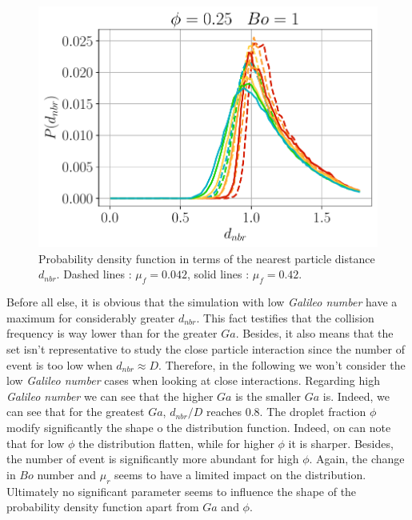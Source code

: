 \begin{figure}[h!]
    \includegraphics[height=0.15\textheight]{image/N_10/Pcond/probaNBo1PHI0_25.pdf}
    \caption{Probability density function in terms of the nearest particle distance $d_{nbr}$. Dashed lines : $\mu_f = 0.042$, solid lines : $\mu_f = 0.42$.} 
    \label{fig:Pdmin}
\end{figure} 
Before all else, it is obvious that the simulation with low \textit{Galileo number} have a maximum for considerably greater $d_{nbr}$. 
This fact testifies that the collision frequency is way lower than for the greater $Ga$. 
Besides, it also means that the set isn't representative to study the close particle interaction since the number of event is too low when $d_{nbr}\approx D$. 
Therefore, in the following we won't consider the low \textit{Galileo number} cases when looking at close interactions.
Regarding high \textit{Galileo number} we can see that the higher $Ga$ is the smaller $Ga$ is. 
Indeed, we can see that for the greatest $Ga$, $d_{nbr}/D$ reaches $0.8$.
The droplet fraction $\phi$ modify significantly the shape o the distribution function. 
Indeed, on can note that for low $\phi$ the distribution flatten, while for higher $\phi$ it is sharper. 
Besides, the number of event is significantly more abundant for high $\phi$.
Again, the change in $Bo$ number and $\mu_r$ seems to have a limited impact on the distribution. 
Ultimately no significant parameter seems to influence the shape of the probability density function apart from $Ga$ and $\phi$. 

